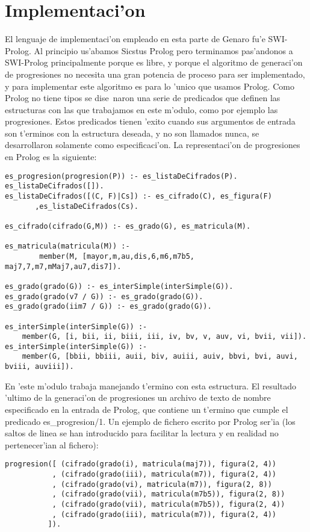 \documentclass[a4paper,12pt]{article}
\begin{document}
\section {Implementaci'on}
El lenguaje de implementaci'on empleado en esta parte de Genaro fu'e SWI-Prolog. Al principio us'abamos Sicstus Prolog pero terminamos pas'andonos a SWI-Prolog principalmente porque es libre, y porque el algoritmo de generaci'on de progresiones no necesita una gran potencia de proceso para ser implementado, y para implementar este algoritmo es para lo 'unico que usamos Prolog.
\newline
Como Prolog no tiene tipos se dise~naron una serie de predicados que definen las estructuras con las que trabajamos en este m'odulo, como por ejemplo las progresiones. Estos predicados tienen 'exito cuando sus argumentos de entrada son t'erminos con la estructura deseada, y no son llamados nunca, se desarrollaron solamente como especificaci'on.
\newline
La representaci'on de progresiones en Prolog es la siguiente:
        \begin{verbatim}
es_progresion(progresion(P)) :- es_listaDeCifrados(P).
es_listaDeCifrados([]).
es_listaDeCifrados([(C, F)|Cs]) :- es_cifrado(C), es_figura(F)
       ,es_listaDeCifrados(Cs).

es_cifrado(cifrado(G,M)) :- es_grado(G), es_matricula(M).

es_matricula(matricula(M)) :- 
        member(M, [mayor,m,au,dis,6,m6,m7b5, maj7,7,m7,mMaj7,au7,dis7]).

es_grado(grado(G)) :- es_interSimple(interSimple(G)).
es_grado(grado(v7 / G)) :- es_grado(grado(G)).
es_grado(grado(iim7 / G)) :- es_grado(grado(G)).

es_interSimple(interSimple(G)) :-
	member(G, [i, bii, ii, biii, iii, iv, bv, v, auv, vi, bvii, vii]).
es_interSimple(interSimple(G)) :-
	member(G, [bbii, bbiii, auii, biv, auiii, auiv, bbvi, bvi, auvi, bviii, auviii]).
        \end{verbatim}
En 'este m'odulo trabaja manejando t'ermino con esta estructura. El resultado 'ultimo de la generaci'on de progresiones un archivo de texto de nombre especificado en la entrada de Prolog, que contiene un t'ermino que cumple el predicado es\_progresion/1. Un ejemplo de fichero escrito por Prolog ser'ia (los saltos de linea se han introducido para facilitar la lectura y en realidad no pertenecer'ian al fichero):
        \begin{verbatim}
progresion([ (cifrado(grado(i), matricula(maj7)), figura(2, 4))
           , (cifrado(grado(iii), matricula(m7)), figura(2, 4))
           , (cifrado(grado(vi), matricula(m7)), figura(2, 8))
           , (cifrado(grado(vii), matricula(m7b5)), figura(2, 8))
           , (cifrado(grado(vii), matricula(m7b5)), figura(2, 4))
           , (cifrado(grado(iii), matricula(m7)), figura(2, 4))
          ]).
        \end{verbatim}
\end{document}
